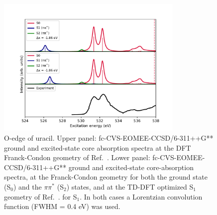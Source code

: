 \documentclass[journal=jctcce,manuscript=article]{achemso}
\begin{document}

\begin{figure}[H]
\includegraphics[width=0.8\textwidth]{Spectra/DFT_Uracil_Sn_O.pdf}
\caption{O-edge of uracil. Upper panel: fc-CVS-EOMEE-CCSD/6-311++G** ground and excited-state core absorption spectra at the DFT Franck-Condon geometry of 
Ref.~.
Lower panel: fc-CVS-EOMEE-CCSD/6-311++G** ground and excited-state core-absorption spectra, at the Franck-Condon geometry for both the ground state (S$_0$) and the $\pi\pi^*$ (S$_2$) states, and at the TD-DFT optimized S$_1$ geometry of 
Ref.~.
for S$_1$. 
In both cases a Lorentzian convolution function (FWHM = 0.4 eV) was used.
\label{fgr:uracil:trnexafs_uracil_o:DFT}}
\end{figure}
\end{document}
